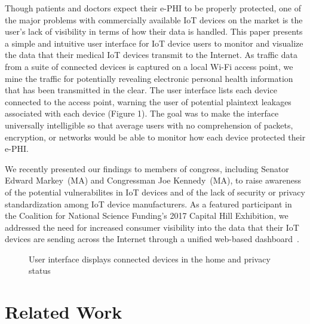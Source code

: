 Though patients and doctors expect their e-PHI to be properly protected, one
of the major problems with commercially available IoT devices on the market is
the user's lack of visibility in terms of how their data is handled. This
paper presents a simple and intuitive user interface for IoT device users to
monitor and visualize the data that their medical IoT devices transmit to the
Internet. As traffic data from a suite of connected devices is captured on a
local Wi-Fi access point, we mine the traffic for potentially revealing
electronic personal health information that has been transmitted in the clear.
The user interface lists each device connected to the access point, warning
the user of potential plaintext leakages associated with each device (Figure
1). The goal was to make the interface universally intelligible so that
average users with no comprehension of packets, encryption, or networks would
be able to monitor how each device protected their e-PHI.

We recently presented our findings to members of congress, including Senator
Edward Markey~(MA) and Congressman Joe Kennedy~(MA), to raise awareness of the
potential vulnerabilites in IoT devices and of the lack of security or privacy
standardization among IoT device manufacturers. As a featured
participant in the Coalition for National Science Funding's 2017 Capital Hill Exhibition,
we addressed the need for increased consumer visibility into the data that their
IoT devices are sending across the Internet through a unified web-based dashboard~\cite{cra}.
\begin{figure}[t]
  \centering
  \caption{User interface displays connected devices in the home and privacy status}
  \label{fig:dashboard}
\end{figure}

\section{Related Work}

